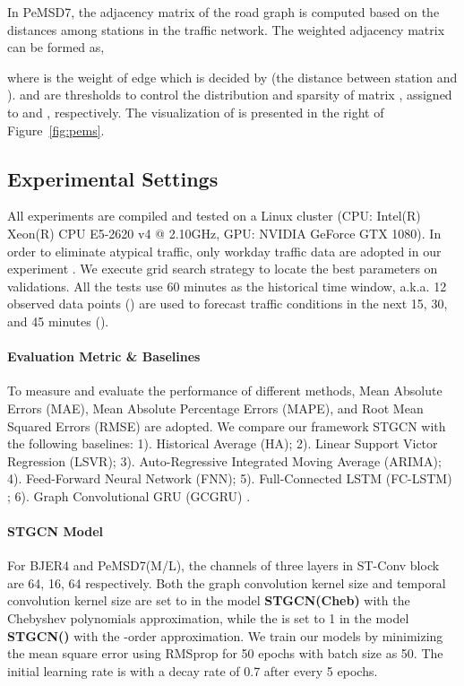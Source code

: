 \documentclass{article}
\begin{document}
In PeMSD7, the adjacency matrix of the road graph is computed based on the distances among stations in the traffic network. The weighted adjacency matrix  can be formed as,

where  is the weight of edge which is decided by  (the distance between station  and ).  and  are thresholds to control the distribution and sparsity of matrix , assigned to  and , respectively. The visualization of  is presented in the right of Figure~\ref{fig:pems}.

\subsection{Experimental Settings}
All experiments are compiled and tested on a Linux cluster (CPU: Intel(R) Xeon(R) CPU E5-2620 v4 @ 2.10GHz, GPU: NVIDIA GeForce GTX 1080). In order to eliminate atypical traffic, only workday traffic data are adopted in our experiment \cite{li2015traffic}. We execute grid search strategy to locate the best parameters on validations. All the tests use 60 minutes as the historical time window, a.k.a. 12 observed data points () are used to forecast traffic conditions in the next 15, 30, and 45 minutes ().

\paragraph{Evaluation Metric \& Baselines} 
To measure and evaluate the performance of different methods, Mean Absolute Errors (MAE), Mean Absolute Percentage Errors (MAPE), and Root Mean Squared Errors (RMSE) are adopted. We compare our framework STGCN with the following baselines: 
1). Historical Average (HA); 2). Linear Support Victor Regression (LSVR); 3). Auto-Regressive Integrated Moving Average (ARIMA); 4). Feed-Forward Neural Network (FNN); 5). Full-Connected LSTM (FC-LSTM) \cite{sutskever2014sequence}; 6). Graph Convolutional GRU (GCGRU) \cite{li2018dcrnn_traffic}.

\paragraph{STGCN Model} 
For BJER4 and PeMSD7(M/L), the channels of three layers in ST-Conv block are 64, 16, 64 respectively. Both the graph convolution kernel size  and temporal convolution kernel size  are set to  in the model \textbf{STGCN(Cheb)} with the Chebyshev polynomials approximation, while the  is set to 1 in the model \textbf{STGCN()} with the -order approximation. We train our models by minimizing the mean square error using RMSprop for 50 epochs with batch size as 50. The initial learning rate is  with a decay rate of 0.7 after every 5 epochs. 
\end{document}
